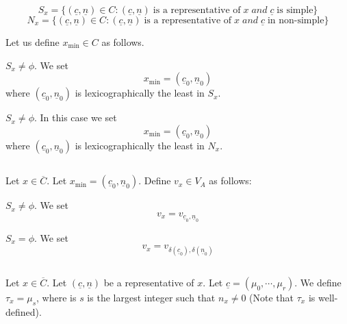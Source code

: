 $$
S_{x}=\{(\underline{c}, \underline{n}) \in C: (\underline{c}, \underline{n})\; \text{is a representative of}\; x \; and \; \underline{c}\; \text{is simple}\}
$$
$$
N_{x}=\{(\underline{c}, \underline{n}) \in C : (\underline{c},\underline{n})\; \text{is a representative of}\; x \; and \;\underline{c} \; \text{in non-simple}\}
$$

Let us define $x_{\min} \in C$ as follows.

\setcounter{case}{0}
\begin{case}\label{art9-subsec3.12-case-1}
$S_{x} \neq \phi$. We set
$$
x_{\min}= (\underline{c}_{0}, \underline{n}_{0})
$$
where $(\underline{c}_{0}, \underline{n}_{0})$ is lexicographically the least in $S_{x}$.
\end{case}

\begin{case}\label{art9-subsec3.12-case-2}
$S_{x}\neq \phi$. In this case we set
$$
x_{\min} = (\underline{c}_{0}, \underline{n}_{0})
$$
where $(\underline{c}_{0}, \underline{n}_{0})$ is lexicographically the least in $N_{x}$.
\end{case}

\subsection{}\label{art9-subsec-3.13}
Let $x \in \overline{C}$. Let $x_{\min}= (\underline{c}_{0}, \underline{n}_{0})$. Define $v_{x} \in V_{A}$ as follows:

\setcounter{case}{0}
\begin{case}\label{art9-subsec3.13-case-1}
$S_{x}\neq \phi$. We set
$$
v_{x}=v_{\underline{c}_{0}, \underline{n}_{0}}
$$
\end{case}
\begin{case}\label{art9-subsec3.13-case-2}
$S_{x}=\phi$. We set
$$
v_{x}=v_{\delta(\underline{c}_{0}), \delta(\underline{n}_{0})}
$$
\end{case}

\subsection{}\label{art9-subsec-3.14}
 Let $x\in \overline{C}$. Let $(\underline{c}, \underline{n})$ be a representative of $x$. Let $\underline{c} = (\mu_{0}, \cdots, \mu_{r})$. We define $\tau_{x} = \mu_{s}$, where is $s$ is the largest integer such that $n_{x} \neq 0$ (Note that $\tau_{x}$ is well-defined).

